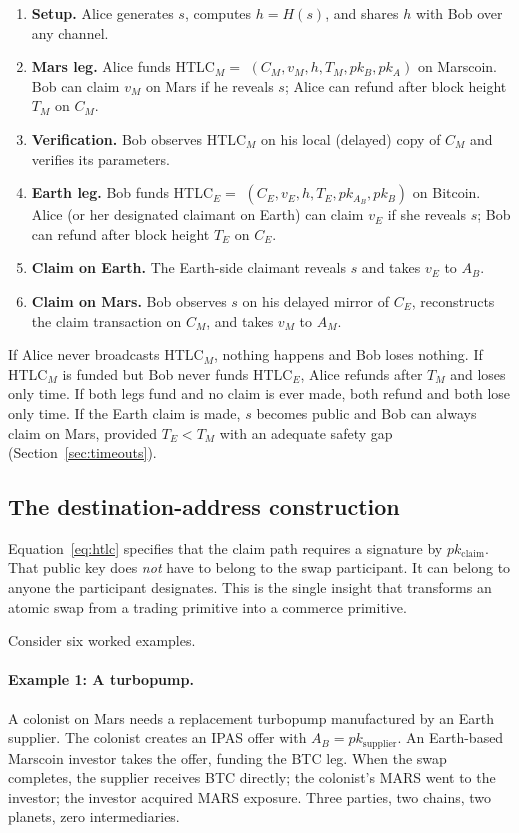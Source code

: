 \documentclass[11pt]{article}
\begin{document}
\begin{enumerate}
  \item \textbf{Setup.} Alice generates $s$, computes $h = H(s)$, and shares $h$ with Bob over any channel.
  \item \textbf{Mars leg.} Alice funds HTLC$_M = $ $(C_M, v_M, h, T_M, pk_B, pk_A)$ on Marscoin. Bob can claim $v_M$ on Mars if he reveals $s$; Alice can refund after block height $T_M$ on $C_M$.
  \item \textbf{Verification.} Bob observes HTLC$_M$ on his local (delayed) copy of $C_M$ and verifies its parameters.
  \item \textbf{Earth leg.} Bob funds HTLC$_E = $ $(C_E, v_E, h, T_E, pk_{A_B}, pk_B)$ on Bitcoin. Alice (or her designated claimant on Earth) can claim $v_E$ if she reveals $s$; Bob can refund after block height $T_E$ on $C_E$.
  \item \textbf{Claim on Earth.} The Earth-side claimant reveals $s$ and takes $v_E$ to $A_B$.
  \item \textbf{Claim on Mars.} Bob observes $s$ on his delayed mirror of $C_E$, reconstructs the claim transaction on $C_M$, and takes $v_M$ to $A_M$.
\end{enumerate}

If Alice never broadcasts HTLC$_M$, nothing happens and Bob loses nothing. If HTLC$_M$ is funded but Bob never funds HTLC$_E$, Alice refunds after $T_M$ and loses only time. If both legs fund and no claim is ever made, both refund and both lose only time. If the Earth claim is made, $s$ becomes public and Bob can always claim on Mars, provided $T_E < T_M$ with an adequate safety gap (Section~\ref{sec:timeouts}).

\subsection{The destination-address construction}
\label{sec:destination}

Equation~\ref{eq:htlc} specifies that the claim path requires a signature by $pk_{\text{claim}}$. That public key does \emph{not} have to belong to the swap participant. It can belong to anyone the participant designates. This is the single insight that transforms an atomic swap from a trading primitive into a commerce primitive.

Consider six worked examples.

\paragraph{Example 1: A turbopump.}
A colonist on Mars needs a replacement turbopump manufactured by an Earth supplier. The colonist creates an IPAS offer with $A_B = pk_{\text{supplier}}$. An Earth-based Marscoin investor takes the offer, funding the BTC leg. When the swap completes, the supplier receives BTC directly; the colonist's MARS went to the investor; the investor acquired MARS exposure. Three parties, two chains, two planets, zero intermediaries.
\end{document}
